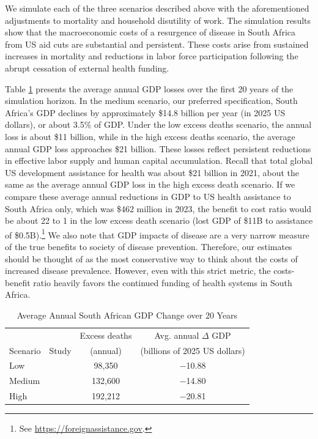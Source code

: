 \documentclass[letterpaper,12pt]{article}
\theoremstyle{definition}
\begin{document}
\begin{spacing}{1.5}
We simulate each of the three scenarios described above with the aforementioned adjustments to mortality and household disutility of work. The simulation results show that the macroeconomic costs of a resurgence of disease in South Africa from US aid cuts are substantial and persistent. These costs arise from sustained increases in mortality and reductions in labor force participation following the abrupt cessation of external health funding.

Table \ref{tab:avgGDPChange} presents the average annual GDP losses over the first 20 years of the simulation horizon. In the medium scenario, our preferred specification, South Africa's GDP declines by approximately \$\num{14.8} billion per year (in 2025 US dollars), or about \num{3.5}\% of GDP. Under the low excess deaths scenario, the annual loss is about \$11 billion, while in the high excess deaths scenario, the average annual GDP loss approaches \$21 billion. These losses reflect persistent reductions in effective labor supply and human capital accumulation. Recall that total global US development assistance for health was about \$21 billion in 2021, about the same as the average annual GDP loss in the high excess death scenario. If we compare these average annual reductions in GDP to US health assistance to South Africa only, which was \$462 million in 2023, the benefit to cost ratio would be about 22 to 1 in the low excess death scenario (lost GDP of \$11B to assistance of \$\num{0.5}B).\footnote{See \href{https://foreignassistance.gov}{https://foreignassistance.gov}.} We also note that GDP impacts of disease are a very narrow measure of the true benefits to society of disease prevention.  Therefore, our estimates should be thought of as the most conservative way to think about the costs of increased disease prevalence. However, even with this strict metric, the costs-benefit ratio heavily favors the continued funding of health systems in South Africa.

\begin{table}[H] \centering \captionsetup{width=6.0in}
  \caption{\label{tab:avgGDPChange}Average Annual South African GDP Change over 20 Years}
  \begin{tabular}{llcc}
    \hline\hline
             &       & Excess deaths & Avg. annual $\Delta$ GDP \\[-1.5mm]
    \multicolumn{1}{c}{Scenario} & \multicolumn{1}{c}{Study} & (annual) & (billions of 2025 US dollars) \\
    \hline\hline
    Low    & \citet{Brink2025}  &  98,350 & \num{-10.88} \\
    Medium & \citet{Gandhi2025} & 132,600 & \num{-14.80} \\
    High   & \citet{KS2025}     & 192,212 & \num{-20.81} \\
    \hline\hline
  \end{tabular}
\end{table}


\end{spacing}
\end{document}
